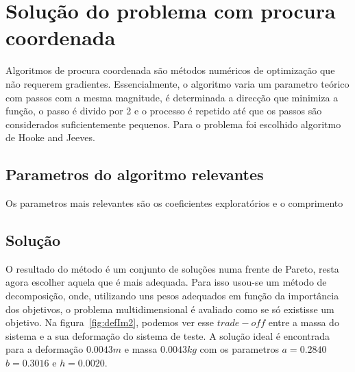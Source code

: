 \documentclass[a4paper,12pt]{article}
\begin{document}
\section{Solução do problema com procura coordenada}

Algoritmos de procura coordenada são métodos numéricos de optimização que não requerem gradientes. Essencialmente, o algoritmo varia um parametro teórico com passos com a mesma magnitude, é determinada a direcção que minimiza a função, o passo é divido por 2 e o processo é repetido até que os passos são considerados suficientemente pequenos. Para o problema foi escolhido algoritmo de Hooke and Jeeves.


\subsection{Parametros do algoritmo relevantes}

Os parametros mais relevantes são os coeficientes exploratórios e o comprimento 



\subsection{Solução}

O resultado do método é um conjunto de soluções numa frente de Pareto, resta agora escolher aquela que é mais adequada. Para isso usou-se um método de decomposição, onde, utilizando uns pesos adequados em função da importância dos objetivos, o problema multidimensional é avaliado como se só existisse um objetivo. Na figura~\ref{fig:defIm2}, podemos ver esse $trade-off$ entre a massa do sistema e a sua deformação do sistema de teste. A solução ideal é encontrada para a deformação $0.0043m$ e massa $0.0043kg$ com os parametros $a = 0.2840$ $b = 0.3016$ e $h = 0.0020$.
\end{document}
